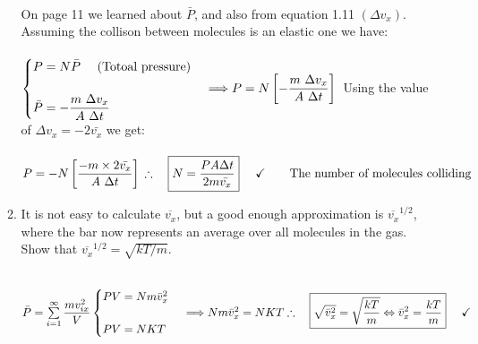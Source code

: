 \documentclass[fleqn]{article}
\begin{document}
\begin{enumerate}
\begin{enumerate}
          \textcolor{hwColor}{
            \\
            On page 11 we learned about $\bar{P}$, and also from equation 1.11 $(\Delta v_x)$. Assuming the collison between 
            molecules is an elastic one we have:
            \\
            \\
            $
              \begin{cases}
                P=N \bar{P} ~~~~ (\text{Totoal pressure}) 
                \\
                \\
                \bar{P}=-\dfrac{m ~ \Delta v_x}{A ~ \Delta t}
              \end{cases} \Longrightarrow 
              P=N \left[-\dfrac{m ~ \Delta v_x}{A ~ \Delta t}\right]
              \\
              \\
            $
            Using the value of $\Delta v_x=-2 \bar{v_x}$ we get:
            \\
            \\
            $
              P=-N \left[\dfrac{-m \times 2 \bar{v_x}}{A ~ \Delta t}\right]
              \\
              \\
              \\
              \therefore ~~~ \boxed{
                N=\dfrac{PA \Delta t}{2 m \bar{v_x}}
              } ~~~~ \checkmark ~~~~~~ \text{The number of molecules colliding}
              \\
              \\
            $ 
          }

        \item It is not easy to calculate $\overline{v_x}$, but a good enough approximation is $\overline{v_x}^{1/2}$, where the bar 
        now represents an average over all molecules in the gas. Show that $\overline{v_x}^{1/2}=\sqrt{kT/m}.$

          \textcolor{hwColor}{
            \\
            $
              \bar{P}=\sum\limits_{i=1}^{\infty} \dfrac{m v^2_{ix}}{V}
              \\
              \\
              \begin{cases}
                PV=N m \bar{v}^2_x
                \\
                \\
                PV=N K T
              \end{cases}
              \\
              \\
              \Longrightarrow N m \bar{v}^2_x=N K T 
              \\
              \\
              \\
              \therefore ~~~ \boxed{
                \sqrt{\bar{v}^2_x}=\sqrt{\dfrac{kT}{m}} \Leftrightarrow \bar{v}^2_x=\dfrac{kT}{m}
              } ~~~~ \checkmark
              \\
            $
          }
          

\end{enumerate}
\end{enumerate}
\end{document}
